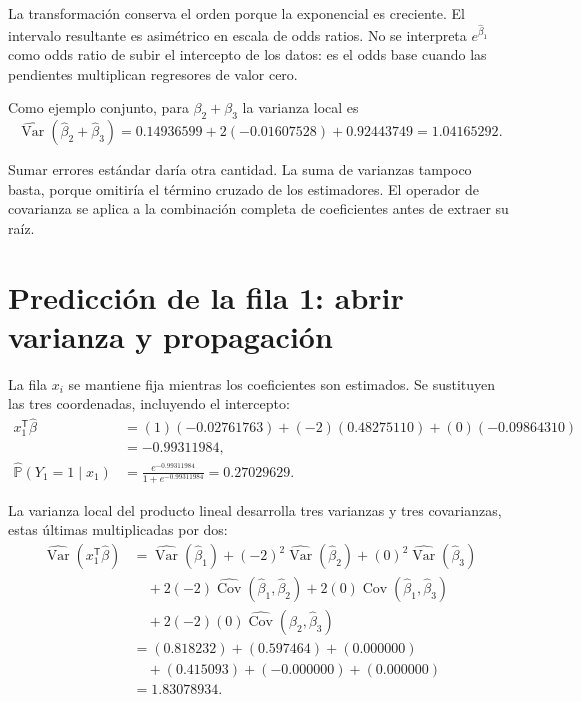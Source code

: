 \documentclass[11pt,a4paper]{article}
\newcommand{\Prob}{\mathbb P}
\newcommand{\T}{^{\mathsf T}}
\DeclareMathOperator{\Var}{Var}
\DeclareMathOperator{\Cov}{Cov}
\begin{document}
La transformación conserva el orden porque la exponencial
es creciente. El intervalo resultante es asimétrico
en escala de odds ratios.
No se interpreta \(e^{\widehat\beta_1}\) como odds ratio
de subir el intercepto de los datos:
es el odds base cuando las pendientes multiplican
regresores de valor cero.

Como ejemplo conjunto, para \(\beta_2+\beta_3\)
la varianza local es
\[
\widehat{\Var}(\widehat\beta_2+\widehat\beta_3)=0.14936599+2(-0.01607528)+0.92443749=1.04165292.
\]

Sumar errores estándar daría otra cantidad.
La suma de varianzas tampoco basta, porque omitiría
el término cruzado de los estimadores.
El operador de covarianza se aplica a la combinación
completa de coeficientes antes de extraer su raíz.

\clearpage
\section{Predicción de la fila 1: abrir varianza y propagación}\label{logit110}
\begingroup\small
\setlength{\abovedisplayskip}{4pt}\setlength{\belowdisplayskip}{4pt}
La fila \(x_i\) se mantiene fija mientras los coeficientes
son estimados. Se sustituyen las tres coordenadas,
incluyendo el intercepto:
\[
\begin{aligned}
x_{1}\T\widehat\beta&=(1)(-0.02761763)+(-2)(0.48275110)+(0)(-0.09864310)\\&=-0.99311984,\\\widehat{\Prob}(Y_{1}=1\mid x_{1})&=\frac{e^{-0.99311984}}{1+e^{-0.99311984}}=0.27029629.\end{aligned}
\]

La varianza local del producto lineal desarrolla tres varianzas
y tres covarianzas, estas últimas multiplicadas por dos:
\[
\begin{aligned}
\widehat{\Var}(x_{1}\T\widehat\beta)&=\widehat{\Var}(\widehat\beta_1)+(-2)^2\widehat{\Var}(\widehat\beta_2)+(0)^2\widehat{\Var}(\widehat\beta_3)\\&\quad+2(-2)\widehat{\Cov}(\widehat\beta_1,\widehat\beta_2)+2(0)\widehat{\Cov}(\widehat\beta_1,\widehat\beta_3)\\&\quad+2(-2)(0)\widehat{\Cov}(\widehat\beta_2,\widehat\beta_3)\\&=(0.818232)+(0.597464)+(0.000000)\\&\quad+(0.415093)+(-0.000000)+(0.000000)\\&=1.83078934.\end{aligned}
\]
\end{document}
